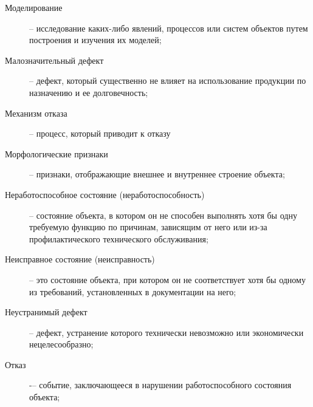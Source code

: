 \begin{description}
\item
[Моделирование]-- исследование каких-либо явлений, процессов или систем объектов путем построения и изучения их моделей;
\item
[Малозначительный дефект] -- дефект, который существенно не влияет на использование продукции по назначению и ее долговечность;
\item
[Механизм отказа] -- процесс, который приводит к отказу
\item
[Морфологические признаки]-- признаки, отображающие внешнее и внутреннее строение объекта;
\item
[Неработоспособное состояние (неработоспособность)] -- состояние объекта, в котором он не способен выполнять хотя бы одну требуемую функцию по причинам, зависящим от него или из-за профилактического технического обслуживания;
\item
[Неисправное состояние (неисправность) ] -- это состояние объекта, при котором он не соответствует хотя бы одному из требований, установленных в документации на него;
\item
[Неустранимый дефект] -- дефект, устранение которого технически невозможно или экономически нецелесообразно;
\item
[Отказ]  -–  событие, заключающееся в нарушении работоспособного состояния объекта;


\end{description}
